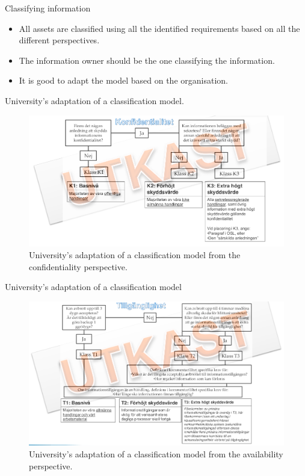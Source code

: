 \documentclass{beamer}
\begin{document}
\begin{frame}{Classifying information}
  \begin{itemize}
    \item All assets are classified using all the identified requirements based
      on all the different perspectives.
    \item The information owner should be the one classifying the information.
    \item It is good to adapt the model based on the organisation.
  \end{itemize}
\end{frame}

\begin{frame}{University's adaptation of a classification model.}
  \begin{figure}
    \includegraphics[width=\textwidth]{Figures/miun-klassificering.png}
    \caption{University's adaptation of a classification model from the
      confidentiality perspective.}
  \end{figure}
\end{frame}

\begin{frame}{University's adaptation of a classification model}
  \begin{figure}
    \includegraphics[width=\textwidth]{Figures/miun-tillganglighet.png}
    \caption{University's adaptation of a classification model from the
      availability perspective.}
  \end{figure}
\end{frame}
\end{document}

